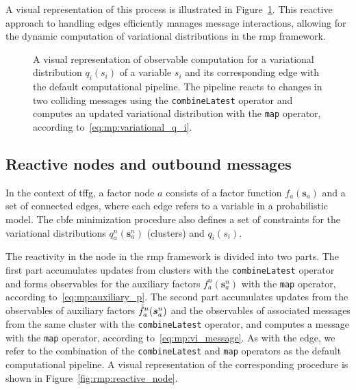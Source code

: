 A visual representation of this process is illustrated in Figure~\ref{fig:rmp:reactive_edge}.
This reactive approach to handling edges efficiently manages message interactions, allowing
for the dynamic computation of variational distributions in the \ac{rmp} framework.

\begin{figure}
  \centering
  \resizebox{\textwidth}{!}{}
  \caption{A visual representation of observable computation for a variational distribution $q_i(s_i)$ of a variable $s_i$ and its corresponding edge with the default computational pipeline.
    The pipeline reacts to changes in two colliding messages using the \texttt{combineLatest}
    operator and computes an updated variational distribution with the \texttt{map} operator,
    according to~\eqref{eq:mp:variational_q_i}.
  }
  \label{fig:rmp:reactive_edge}
\end{figure}

\subsection{Reactive nodes and outbound messages}

In the context of \ac{tffg}, a factor node $a$ consists of a factor function $f_a(\bm{s}_a)$ and a
set of connected edges, where each edge refers to a variable in a probabilistic model.
The \ac{cbfe} minimization procedure also defines a set of constraints for the variational distributions
$q^n_a(\bm{s}^n_a)$ (clusters) and $q_i(s_i)$.

The reactivity in the node in the \ac{rmp} framework is divided into two parts.
The first part accumulates updates from clusters with the \texttt{combineLatest} operator and
forms observables for the auxiliary factors $f^n_a(\bm{s}^n_a)$ with the \texttt{map}
operator, according to~\eqref{eq:mp:auxiliary_p}.
The second part accumulates updates from the observables of auxiliary factors
$\accentset{\circ}{f}^n_a(\bm{s}^n_a)$ and the observables of associated messages from the same cluster
with the \texttt{combineLatest} operator, and computes a message with the \texttt{map}
operator, according to~\eqref{eq:mp:vi_message}.
As with the edge, we refer to the combination of the \texttt{combineLatest} and \texttt{map}
operators as the default computational pipeline.
A visual representation of the corresponding procedure is shown in
Figure~\ref{fig:rmp:reactive_node}.

